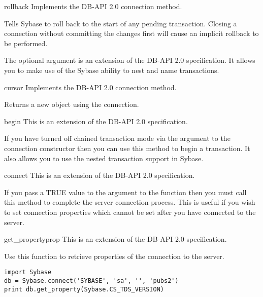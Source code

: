 \begin{methoddesc}[Connection]{rollback}{}
Implements the DB-API 2.0 connection  method.

Tells Sybase to roll back to the start of any pending transaction.
Closing a connection without committing the changes first will cause
an implicit rollback to be performed.

The optional  argument is an extension of the DB-API 2.0
specification.  It allows you to make use of the Sybase ability to
nest and name transactions.
\end{methoddesc}

\begin{methoddesc}[Connection]{cursor}{}
Implements the DB-API 2.0 connection  method.

Returns a new  object using the connection.
\end{methoddesc}

\begin{methoddesc}[Connection]{begin}{}
This is an extension of the DB-API 2.0 specification.

If you have turned off chained transaction mode via the
 argument to the connection constructor then you can
use this method to begin a transaction.  It also allows you to use the
nested transaction support in Sybase.
\end{methoddesc}

\begin{methoddesc}[Connection]{connect}{}
This is an extension of the DB-API 2.0 specification.

If you pass a TRUE value to the  argument to the
 function then you must call this method to
complete the server connection process.  This is useful if you wish to
set connection properties which cannot be set after you have connected
to the server.
\end{methoddesc}

\begin{methoddesc}[Connection]{get_property}{prop}
This is an extension of the DB-API 2.0 specification.

Use this function to retrieve properties of the connection to the
server.

\begin{verbatim}
import Sybase
db = Sybase.connect('SYBASE', 'sa', '', 'pubs2')
print db.get_property(Sybase.CS_TDS_VERSION)
\end{verbatim}
\end{methoddesc}

